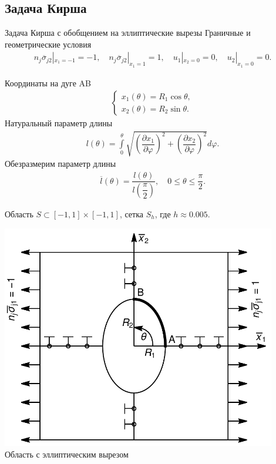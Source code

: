 \subsection{Задача Кирша}
\begin{frame}{Задача Кирша с обобщением на эллиптические вырезы}
Граничные и геометрические условия
\begin{gather*}
	n_j \overline{\sigma}_{j2} |_{x_1 = -1} = -1,
	\quad
	n_j \overline{\sigma}_{j2} |_{x_1 =  1} =  1,
	\quad
	u_1 |_{x_2 = 0} = 0,
	\quad
	u_2 |_{x_1 = 0} = 0.
\end{gather*}
\begin{minipage}{0.49\textwidth}
	Координаты на дуге AB
	\begin{gather*}
		\begin{cases}
			x_1 (\theta) = R_1 \cos \theta, \\
			x_2 (\theta) = R_2 \sin \theta.
		\end{cases}
	\end{gather*}
	Натуральный параметр длины
\begin{gather*}
	l (\theta) = \int\limits_0^{\theta} \sqrt{
		\left( \dfrac{\partial x_1}{\partial \varphi} \right)^2 +
		\left( \dfrac{\partial x_2}{\partial \varphi} \right)^2
	} d \varphi.
\end{gather*}
Обезразмерим параметр длины
\begin{gather*}
	\overline{l} (\theta) = \dfrac{l (\theta)}{l \left( \dfrac{\pi}{2} \right)},
	\quad
	0 \leqslant \theta \leqslant \dfrac{\pi}{2}.
\end{gather*}
\end{minipage}
\begin{minipage}{0.49\textwidth}
	\justifying
	Область $S \subset [-1, 1] \times [-1, 1]$, сетка $S_h$, где $h \approx 0.005$.
	\begin{center}
		\includegraphics[width=0.9\textwidth]{pics/EllipseStressPresentation.pdf}
		Область с эллиптическим вырезом
	\end{center}
\end{minipage}
\end{frame}


